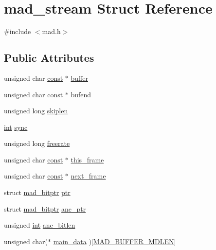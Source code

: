 \hypertarget{structmad__stream}{}\section{mad\+\_\+stream Struct Reference}
\label{structmad__stream}


{\ttfamily \#include $<$mad.\+h$>$}

\subsection*{Public Attributes}
\begin{DoxyCompactItemize}
\item 
unsigned char \hyperlink{getopt1_8c_a2c212835823e3c54a8ab6d95c652660e}{const} $\ast$ \hyperlink{structmad__stream_aa66077a746888bc7ebfa9e357c464fed}{buffer}
\item 
unsigned char \hyperlink{getopt1_8c_a2c212835823e3c54a8ab6d95c652660e}{const} $\ast$ \hyperlink{structmad__stream_ade2600fa5c62b5ea540c592ed5b4823c}{bufend}
\item 
unsigned long \hyperlink{structmad__stream_a380775f9816d642c8de9eb0f80b6ac01}{skiplen}
\item 
\hyperlink{xmltok_8h_a5a0d4a5641ce434f1d23533f2b2e6653}{int} \hyperlink{structmad__stream_a1f11c60768caff2595ce4c94b1172d5a}{sync}
\item 
unsigned long \hyperlink{structmad__stream_a28a048e98187e7ba0225f76136a1d295}{freerate}
\item 
unsigned char \hyperlink{getopt1_8c_a2c212835823e3c54a8ab6d95c652660e}{const} $\ast$ \hyperlink{structmad__stream_a7618e13aaba1d5817d30f3aea45a3c3c}{this\+\_\+frame}
\item 
unsigned char \hyperlink{getopt1_8c_a2c212835823e3c54a8ab6d95c652660e}{const} $\ast$ \hyperlink{structmad__stream_aa7d05a829f94f389c5591b66899683ae}{next\+\_\+frame}
\item 
struct \hyperlink{structmad__bitptr}{mad\+\_\+bitptr} \hyperlink{structmad__stream_a987cf5a3e8ab950311e7afeda3ef34db}{ptr}
\item 
struct \hyperlink{structmad__bitptr}{mad\+\_\+bitptr} \hyperlink{structmad__stream_ae9e60e90ae0ada3e6b86f323da60b8e9}{anc\+\_\+ptr}
\item 
unsigned \hyperlink{xmltok_8h_a5a0d4a5641ce434f1d23533f2b2e6653}{int} \hyperlink{structmad__stream_a9c0f59e34e285be5ef1d188c87f99fe6}{anc\+\_\+bitlen}
\item 
unsigned char($\ast$ \hyperlink{structmad__stream_a267dab6426706cbb38fe793d01c49c68}{main\+\_\+data} )\mbox{[}\hyperlink{mac_2config_2i386_2lib-src_2libmad_2mad_8h_a7fe89b4455f663f7932945241f1e4924}{M\+A\+D\+\_\+\+B\+U\+F\+F\+E\+R\+\_\+\+M\+D\+L\+EN}\mbox{]}

\end{DoxyCompactItemize}
